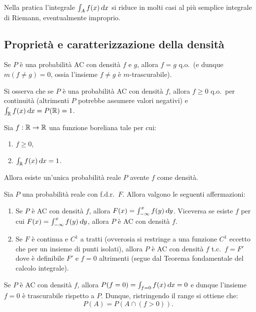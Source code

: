 \begin{multicols*}{2}
\begin{remark}
    Nella pratica l'integrale $\int_A f(x) \dx$ si riduce in molti casi
    al più semplice integrale di Riemann, eventualmente improprio.
\end{remark}

\subsection{Proprietà e caratterizzazione della densità}

\begin{proposition}
    Se $P$ è una probabilità AC con densità $f$ e $g$, allora
    $f = g$ q.o.~(e dunque $m(f \neq g) = 0$, ossia l'insieme
    $f \neq g$ è $m$-trascurabile).
\end{proposition}

\begin{remark}
    Si osserva che se $P$ è una probabilità AC con densità
    $f$, allora $f \geq 0$ q.o.~per continuità (altrimenti $P$ potrebbe
    assumere valori negativi) e $\int_\RR f(x) \dx = P(\RR) = 1$.
\end{remark}

\begin{proposition}
    Sia $f : \mathbb{R} \to \mathbb{R}$ una funzione boreliana tale per cui:
    \begin{enumerate}[(i.)]
        \item $f \geq 0$,
        \item $\int_\RR f(x) \dx = 1$.
    \end{enumerate}
    Allora esiste un'unica probabilità reale $P$ avente $f$ come densità.
\end{proposition}

\begin{proposition}
    Sia $P$ una probabilità reale con f.d.r.~$F$. Allora valgono le seguenti affermazioni:
    \begin{enumerate}[(i.)]
        \item Se $P$ è AC con densità $f$, allora $F(x) = \int_{-\infty}^x f(y) \dy$. Viceversa
        se esiste $f$ per cui $F(x) = \int_{-\infty}^x f(y) \dy$, allora $P$ è AC con densità
        $f$.
        \item Se $F$ è continua e $C^1$ a tratti (ovverosia si restringe a una funzione $C^1$ eccetto che per un insieme di punti isolati),
        allora $P$ è AC con densità $f$ t.c.~$f = F'$ dove è definibile $F'$ e $f = 0$ altrimenti (segue dal Teorema fondamentale del calcolo integrale).
    \end{enumerate}
\end{proposition}

\begin{remark}
    Se $P$ è AC con densità $f$, allora $P(f = 0) = \int_{f = 0} f(x) \dx = 0$ e dunque
    l'insieme $f = 0$ è trascurabile rispetto a $P$. Dunque, ristringendo il range si
    ottiene che:
    \[
        P(A) = P(A \cap (f > 0)).
    \]
\end{remark}

\end{multicols*}